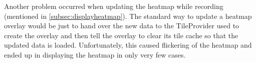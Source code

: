 \documentclass[10pt,a4paper]{article} %
\begin{document}
	Another problem occurred when updating the heatmap while recording (mentioned in \autoref{subsec:displayheatmap}).
	The standard way to update a heatmap overlay would be just to hand over the new data to the TileProvider used to create the overlay and then tell the overlay to clear its tile cache so that the updated data is loaded.
	Unfortunately, this caused flickering of the heatmap and ended up in displaying the heatmap in only very few cases.





    
%    
%    
\end{document}
